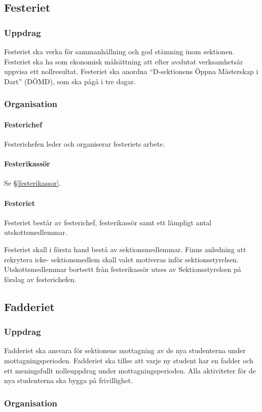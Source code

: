 \documentclass{datateknologsektionen-document}
\begin{document}
\subsection{Festeriet}
\label{festeriet}
\subsubsection{Uppdrag}
Festeriet ska verka för sammanhållning och god stämning inom sektionen. Festeriet ska ha som
ekonomisk målsättning att efter avslutat verksamhetsår uppvisa ett nollresultat. Festeriet ska
anordna ``D-sektionens Öppna Mästerskap i Dart'' (DÖMD), som ska pågå i tre dagar.
\subsubsection{Organisation}
\paragraph{Festerichef}
Festerichefen leder och organiserar festeriets arbete.
\paragraph{Festerikassör}
Se \S \ref{festerikassor}.
\paragraph{Festeriet}
Festeriet består av festerichef, festerikassör samt ett lämpligt antal utskottsmedlemmar.

Festeriet skall i första hand bestå av sektionsmedlemmar. Finns anledning att rekrytera icke-
sektionsmedlem skall valet motiveras inför sektionsstyrelsen. Utskottsmedlemmar bortsett
från festerikassör utses av Sektionsstyrelsen på förslag av festerichefen.
\subsection{Fadderiet}
\label{fadderiet}
\subsubsection{Uppdrag}
Fadderiet ska ansvara för sektionens mottagning av de nya studenterna under
mottagningsperioden. Fadderiet ska tillse att varje ny student har en fadder och ett meningsfullt
nolleuppdrag under mottagningsperioden. Alla aktiviteter för de nya studenterna ska bygga på
frivillighet.
\subsubsection{Organisation}
\end{document}
